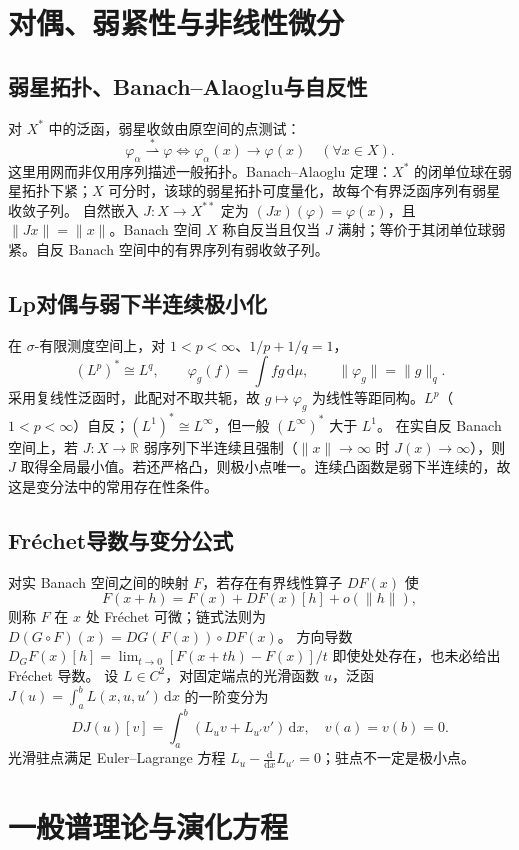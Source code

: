 \documentclass[../main.tex]{subfiles}
\begin{document}
\section{对偶、弱紧性与非线性微分}
\subsection{弱星拓扑、Banach--Alaoglu与自反性}
对 $X^*$ 中的泛函，弱星收敛由原空间的点测试：
\[
\varphi_\alpha\overset{*}{\rightharpoonup}\varphi
\iff\varphi_\alpha(x)\to\varphi(x)\quad(\forall x\in X).
\]
这里用网而非仅用序列描述一般拓扑。Banach--Alaoglu 定理：$X^*$ 的闭单位球在弱星拓扑下紧；$X$ 可分时，该球的弱星拓扑可度量化，故每个有界泛函序列有弱星收敛子列。
自然嵌入 $J:X\to X^{**}$ 定为 $(Jx)(\varphi)=\varphi(x)$，且 $\|Jx\|=\|x\|$。Banach 空间 $X$ 称自反当且仅当 $J$ 满射；等价于其闭单位球弱紧。自反 Banach 空间中的有界序列有弱收敛子列。
\subsection{Lp对偶与弱下半连续极小化}
在 $\sigma$-有限测度空间上，对 $1<p<\infty$、$1/p+1/q=1$，
\[
(L^p)^*\cong L^q,\qquad\varphi_g(f)=\int fg\,\mathrm d\mu,
\qquad\|\varphi_g\|=\|g\|_q.
\]
采用复线性泛函时，此配对不取共轭，故 $g\mapsto\varphi_g$ 为线性等距同构。$L^p$（$1<p<\infty$）自反；$(L^1)^*\cong L^\infty$，但一般 $(L^\infty)^*$ 大于 $L^1$。
在实自反 Banach 空间上，若 $J:X\to\mathbb R$ 弱序列下半连续且强制（$\|x\|\to\infty$ 时 $J(x)\to\infty$），则 $J$ 取得全局最小值。若还严格凸，则极小点唯一。连续凸函数是弱下半连续的，故这是变分法中的常用存在性条件。
\subsection{Fréchet导数与变分公式}
对实 Banach 空间之间的映射 $F$，若存在有界线性算子 $DF(x)$ 使
\[
F(x+h)=F(x)+DF(x)[h]+o(\|h\|),
\]
则称 $F$ 在 $x$ 处 Fréchet 可微；链式法则为 $D(G\circ F)(x)=DG(F(x))\circ DF(x)$。
方向导数 $D_G F(x)[h]=\lim_{t\to0}[F(x+th)-F(x)]/t$ 即使处处存在，也未必给出 Fréchet 导数。
设 $L\in C^2$，对固定端点的光滑函数 $u$，泛函 $J(u)=\int_a^bL(x,u,u')\,\mathrm dx$ 的一阶变分为
\[
DJ(u)[v]=\int_a^b(L_uv+L_{u'}v')\,\mathrm dx,
\quad v(a)=v(b)=0.
\]
光滑驻点满足 Euler--Lagrange 方程 $L_u-\frac{\mathrm d}{\mathrm dx}L_{u'}=0$；驻点不一定是极小点。
\section{一般谱理论与演化方程}
\end{document}
